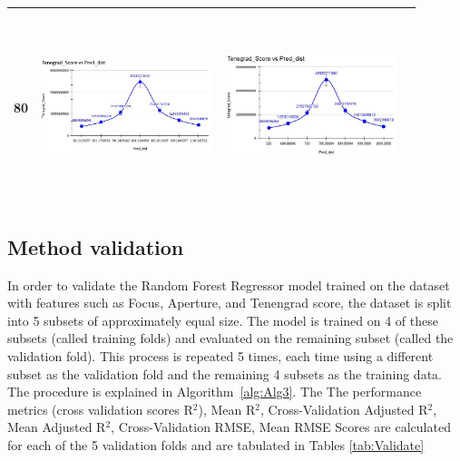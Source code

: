 \documentclass[sn-mathphys]{sn-jnl}%
\theoremstyle{thmstyleone}%
\theoremstyle{thmstyletwo}%
\theoremstyle{thmstylethree}%
\begin{document}
\begin{table}[!htbp]
\begin{tabular}{ c c c c }
\hline
80 &\includegraphics[width=5cm,height=5.5cm]{mlp80.JPG} &
\includegraphics[width=5cm,height=5.5cm]{xgb80.JPG}  \\
\hline

\end{tabular}
\end{table}
\pagebreak

\pagebreak

\subsection{\textsf{Method validation}}
In order to validate the  Random Forest Regressor model trained on the dataset with features such as Focus, Aperture, and Tenengrad score, the dataset is split into 5 subsets of approximately equal size. The model is trained on 4 of these subsets (called training folds) and evaluated on the remaining subset (called the validation fold). This process is repeated 5 times, each time using a different subset as the validation fold and the remaining 4 subsets as the training data. The procedure is explained in Algorithm~\ref{alg:Alg3}. The The performance metrics (cross validation scores R$^{2}$), Mean R$^{2}$, Cross-Validation Adjusted R$^{2}$, Mean Adjusted R$^{2}$, Cross-Validation RMSE, Mean RMSE Scores are calculated for each of the 5 validation folds and are tabulated in  Tables \ref{tab:Validate}
\end{document}
